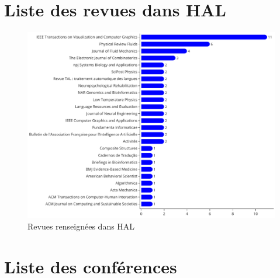 \documentclass[french, 11pt]{dibiso/biso}
\begin{document}




\pagebreak

\section{Liste des revues dans HAL}


\begin{figure}[!h]
  \includegraphics[width=\textwidth]{figures/journals_hal.pdf}
  \centering
  \caption{Revues renseignées dans HAL}
  \label{fig_jorunals_hal}
\end{figure}








\pagebreak

\section{Liste des conférences}
\end{document}
